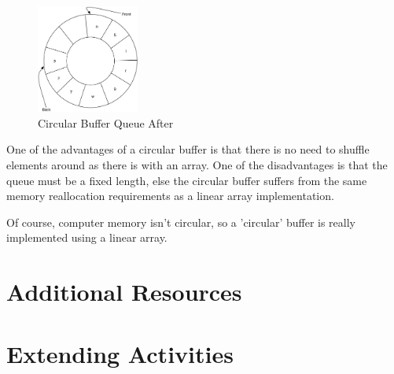 \begin{figure}[H]
\centering
\includegraphics[width=0.3\textwidth]{pictures/circularbuffertwo.jpg}
\caption{Circular Buffer Queue After}
\label{fig:circleQueue2}
\end{figure}



One of the advantages of a circular buffer is that there is no need to shuffle elements around as there is with an array. One of the disadvantages is that the queue must be a fixed length, else the circular buffer suffers from the same memory reallocation requirements as a linear array implementation.

Of course, computer memory isn't circular, so a 'circular' buffer is really implemented using a linear array.


\section{Additional Resources}

\section{Extending Activities}

